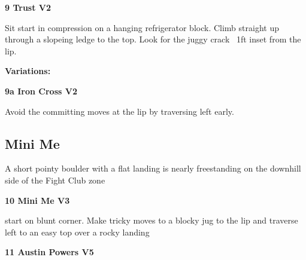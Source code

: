 \begin{multicols}{2}

					\begin{minipage}{\linewidth}	
					\label{rt:Trust}
\colorbox{green!20}{
\textbf{
9 Trust V2     
}
}

					\begin{adjustwidth}{0.5cm}{}				
					Sit start in compression on a hanging refrigerator block. Climb straight up through a slopeing ledge to the top. Look for the juggy crack ~1ft inset from the lip.
					\end{adjustwidth}
					\end{minipage}
						\begin{adjustwidth}{0.5cm}{}				
						\textbf{Variations:} \newline
							\begin{minipage}{\linewidth}	
							\label{vr:Iron Cross}
\colorbox{green!20}{
\textbf{
9a Iron Cross V2   
}
}

							\begin{adjustwidth}{0.5cm}{}				
							Avoid the committing moves at the lip by traversing left early.
							\end{adjustwidth}
							\end{minipage}
						\end{adjustwidth}
			\subsection*{Mini Me}\label{bf:Mini Me}
			\begin{minipage}{\columnwidth}
			A short pointy boulder with a flat landing is nearly freestanding on the downhill side of the Fight Club zone
			\end{minipage}
			
					\begin{minipage}{\linewidth}	
					\label{rt:Mini Me}
\colorbox{green!20}{
\textbf{
10 Mini Me V3  
}
}

					\begin{adjustwidth}{0.5cm}{}				
					start on blunt corner. Make tricky moves to a blocky jug to the lip and traverse left to an easy top over a rocky landing
					\end{adjustwidth}
					\end{minipage}
					\begin{minipage}{\linewidth}	
					\label{rt:Austin Powers}
\colorbox{RoyalBlue!20}{
\textbf{
11 Austin Powers V5    
}
}


\end{minipage}
\end{multicols}
